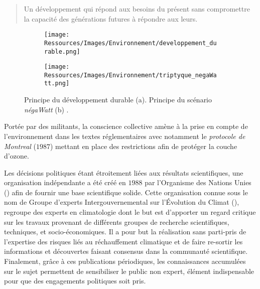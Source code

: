 \blockquote{
    Un développement qui répond aux besoins du présent sans
    compromettre la capacité des générations futures à répondre aux leurs.
}

\begin{figure}
    \centering
    \begin{subfigure}[b]{0.55\textwidth}
        \centering
        \texttt{[image: Ressources/Images/Environnement/developpement\_durable.png]}
        \caption{}
        \label{fig:developpement_durable}
    \end{subfigure}
    \quad
    \begin{subfigure}[b]{0.4\textwidth}
        \centering
        \texttt{[image: Ressources/Images/Environnement/triptyque\_negaWatt.png]}
        \caption{}
        \label{fig:negawatt_axes}
    \end{subfigure}
    \caption[Principe du développement durable et du scénario négaWatt]
             {Principe du développement durable \protect\footnotemark (a). Principe du
              scénario \textit{négaWatt} (b) \parencite{Salomon2012}.}
    \label{fig:developpement_durable_negawatt}
\end{figure}

Portée par des militants, la conscience collective amène à la prise en compte de
l’environnement dans les textes réglementaires avec notamment le \textit{protocole de
Montreal} ($1987$) mettant en place des restrictions afin de protéger la couche d’ozone.

Les décisions politiques étant étroitement liées aux résultats scientifiques,
une organisation indépendante a été créé en $1988$ par l’Organisme des Nations
Unies () afin de fournir une base scientifique solide. Cette organisation connue sous le nom de
Groupe d'experts Intergouvernemental sur l'Évolution du Climat (), regroupe
des experts en climatologie dont le but est d’apporter un regard critique sur
les travaux provenant de différents groupes de recherche scientifiques, techniques,
et socio-économiques. Il a pour but la réalisation sans parti-pris de l’expertise
des risques liés au réchauffement climatique et de faire re-sortir les informations
et découvertes faisant consensus dans la communauté scientifique. Finalement, grâce à ces
publications périodiques, les connaissances accumulées sur le sujet permettent de
sensibiliser le public non expert, élément indispensable pour que des engagements
politiques soit pris.

